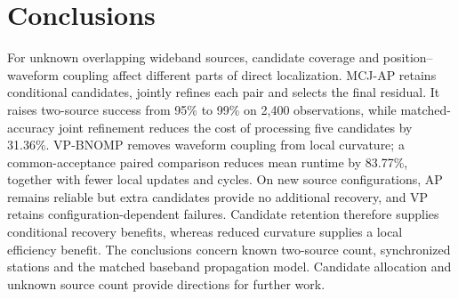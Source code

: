 \documentclass[a4paper,fleqn,review]{cas-sc}
\begin{document}
\FloatBarrier
\section{Conclusions}
For unknown overlapping wideband sources, candidate coverage and position--waveform coupling affect different parts of direct localization. MCJ-AP retains conditional candidates, jointly refines each pair and selects the final residual. It raises two-source success from 95\% to 99\% on 2,400 observations, while matched-accuracy joint refinement reduces the cost of processing five candidates by 31.36\%. VP-BNOMP removes waveform coupling from local curvature; a common-acceptance paired comparison reduces mean runtime by 83.77\%, together with fewer local updates and cycles. On new source configurations, AP remains reliable but extra candidates provide no additional recovery, and VP retains configuration-dependent failures. Candidate retention therefore supplies conditional recovery benefits, whereas reduced curvature supplies a local efficiency benefit. The conclusions concern known two-source count, synchronized stations and the matched baseband propagation model. Candidate allocation and unknown source count provide directions for further work.

\FloatBarrier
\appendix
\FloatBarrier
\end{document}
